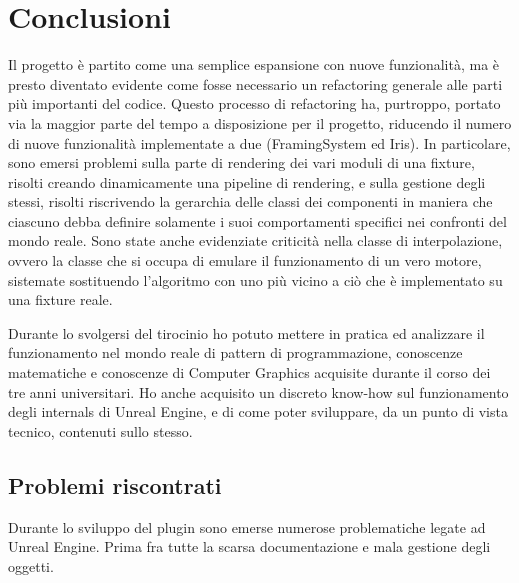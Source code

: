 \documentclass[main.tex]{subfiles}
\begin{document}
\sloppy


\vspace{1.0cm}

\section{Conclusioni}\label{sec:End}
Il progetto è partito come una semplice espansione con nuove funzionalità, ma è presto diventato evidente come fosse necessario un refactoring generale alle parti più importanti del codice. Questo processo di refactoring ha, purtroppo, portato via la maggior parte del tempo a disposizione per il progetto, riducendo il numero di nuove funzionalità implementate a due (FramingSystem ed Iris). In particolare, sono emersi problemi sulla parte di rendering dei vari moduli di una fixture, risolti creando dinamicamente una pipeline di rendering, e sulla gestione degli stessi, risolti riscrivendo la gerarchia delle classi dei componenti in maniera che ciascuno debba definire solamente i suoi comportamenti specifici nei confronti del mondo reale. Sono state anche evidenziate criticità nella classe di interpolazione, ovvero la classe che si occupa di emulare il funzionamento di un vero motore, sistemate sostituendo l'algoritmo con uno più vicino a ciò che è implementato su una fixture reale.

Durante lo svolgersi del tirocinio ho potuto mettere in pratica ed analizzare il funzionamento nel mondo reale di pattern di programmazione, conoscenze matematiche e conoscenze di Computer Graphics acquisite durante il corso dei tre anni universitari. Ho anche acquisito un discreto know-how sul funzionamento degli internals di Unreal Engine, e di come poter sviluppare, da un punto di vista tecnico, contenuti sullo stesso. 

\subsection{Problemi riscontrati}\label{subsec:6_Problems}
Durante lo sviluppo del plugin sono emerse numerose problematiche legate ad Unreal Engine. Prima fra tutte la scarsa documentazione e mala gestione degli oggetti.\newline
\end{document}
